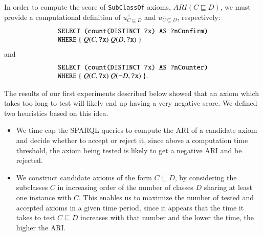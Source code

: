 \documentclass[review]{elsarticle}
\theoremstyle{definition}
\begin{document}
In order to compute the score of \texttt{SubClassOf} axioms, $ARI(C \sqsubseteq D)$, we must provide a computational definition of $u^+_{C \sqsubseteq D}$ and $u^-_{C \sqsubseteq D}$, respectively:
\begin{equation}
  \begin{minipage}[c]{5in}
    \begin{tabbing}
      \quad\=\quad\=\quad\=\kill
      \texttt{SELECT (count(DISTINCT ?x) AS ?nConfirm)}\\
      \texttt{WHERE} \{ $Q(C, \mbox{\tt ?x})$ $Q(D, \mbox{\tt ?x})$ \}
    \end{tabbing}
  \end{minipage}
\end{equation}
and
\begin{equation}
  \begin{minipage}[c]{5in}
    \begin{tabbing}
      \quad\=\quad\=\quad\=\kill
      \texttt{SELECT (count(DISTINCT ?x) AS ?nCounter)}\\
      \texttt{WHERE} \{ $Q(C, \mbox{\tt ?x})$ $Q(\neg D, \mbox{\tt ?x})$ \}.
    \end{tabbing}
  \end{minipage}
\end{equation}

The results of our first experiments described below
showed that an axiom which takes too long to test will likely end up having a very negative score.
We defined two heuristics based on this idea.
\begin{itemize}
\item We time-cap the SPARQL queries to compute the ARI of a candidate axiom and decide whether to accept or reject it, since above a computation time threshold, the axiom being tested is likely to get a negative ARI and be rejected.
\item We construct candidate axioms of the form $C \sqsubseteq D$, by considering
the subclasses $C$ in increasing order of the number of classes $D$ sharing at least
one instance with $C$.
This enables us to maximize the number of tested and accepted axioms in a given time period,
since it appears that the time it takes to test $C \sqsubseteq D$ increases with that number
and the lower the time, the higher the ARI.
\end{itemize}
\end{document}
